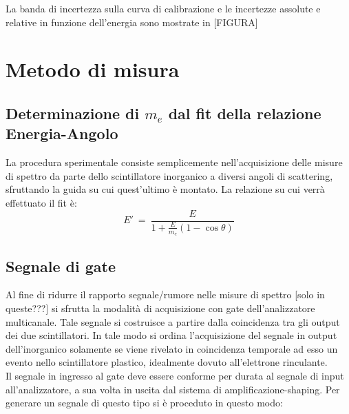 \documentclass[11pt]{article}
\begin{document}
La banda di incertezza sulla curva di calibrazione e le incertezze assolute e relative in funzione dell'energia sono mostrate in [FIGURA]

\section{Metodo di misura}
\subsection{Determinazione di $m_e$ dal fit della relazione Energia-Angolo}
La procedura sperimentale consiste semplicemente nell'acquisizione delle misure di spettro da parte dello scintillatore inorganico a diversi angoli di scattering, sfruttando la guida su cui quest'ultimo è montato. La relazione su cui verrà effettuato il fit è:
\begin{equation}
E'\ = \ \frac{E}{1+\frac{E}{m_e}\left(1-\cos{\theta}\right)}
\end{equation}
\subsection{Segnale di gate}
Al fine di ridurre il rapporto segnale/rumore nelle misure di spettro [solo in queste???] si sfrutta la modalità di acquisizione con gate dell'analizzatore multicanale. Tale segnale si costruisce a partire dalla coincidenza tra gli output dei due scintillatori. In tale modo si ordina l'acquisizione del segnale in output dell'inorganico solamente se viene rivelato in coincidenza temporale ad esso un evento nello scintillatore plastico, idealmente dovuto all'elettrone rinculante.
\\
Il segnale in ingresso al gate deve essere conforme per durata al segnale di input all'analizzatore, a sua volta in uscita dal sistema di amplificazione-shaping. Per generare un segnale di questo tipo si è proceduto in questo modo:
\end{document}
